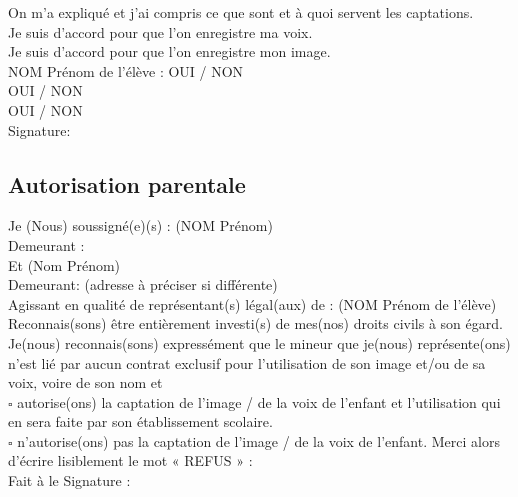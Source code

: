 \documentclass[10pt, a4paper,article]{nsi}
\begin{document}
\dleft{14cm}
{On m'a expliqué et j'ai compris ce que sont et à quoi servent les captations.\\
Je suis d'accord pour que l'on enregistre ma voix.\\
Je suis d'accord pour que l'on enregistre mon image.\\
NOM Prénom de l'élève :}
{
OUI / NON\\
OUI / NON\\
OUI / NON\\
Signature:
}

\subsection*{Autorisation parentale}
Je (Nous) soussigné(e)(s) : {\scriptsize(NOM Prénom)}\dotfill  \\
Demeurant : \dotfill\\
Et  {\scriptsize(Nom Prénom)}\dotfill\\
Demeurant: {\scriptsize(adresse à préciser si différente)}\dotfill\\
Agissant en qualité de représentant(s) légal(aux) de : {\scriptsize(NOM Prénom de l'élève)}\dotfill\\

Reconnais(sons) être entièrement investi(s) de mes(nos) droits civils à son égard. Je(nous) reconnais(sons) expressément que le mineur que je(nous) représente(ons) n'est lié par aucun contrat exclusif pour l'utilisation de son image et/ou de sa voix, voire de son nom et\\

$\square$  autorise(ons) la captation de l'image / de la voix de l'enfant et l'utilisation qui en sera faite par son établissement scolaire.\\
    
$\square$ n'autorise(ons) pas la captation de l'image / de la voix de l'enfant. Merci alors d'écrire lisiblement le mot « REFUS » : \\


Fait à \hspace*{5cm} le \hspace*{7.5cm} Signature : 
\end{document}
